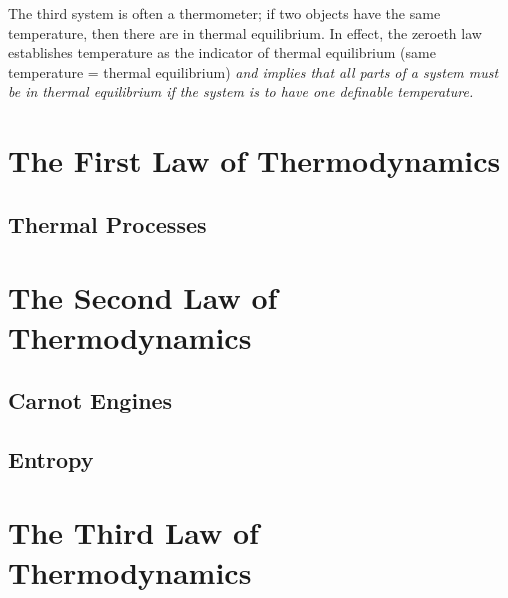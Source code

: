 \documentclass[12pt, a4paper]{article}
\theoremstyle{definition}
\begin{document}
The third system is often a thermometer; if two objects have the same temperature, then there are in thermal equilibrium.
In effect, the zeroeth law establishes temperature as the indicator of thermal equilibrium (same temperature = thermal equilibrium)
\textit{and implies that all parts of a system must be in thermal equilibrium if the system is to have one definable temperature.}


\section{The First Law of Thermodynamics}

\subsection{Thermal Processes}

\section{The Second Law of Thermodynamics}

\subsection{Carnot Engines}

\subsection{Entropy}

\section{The Third Law of Thermodynamics}
\end{document}
